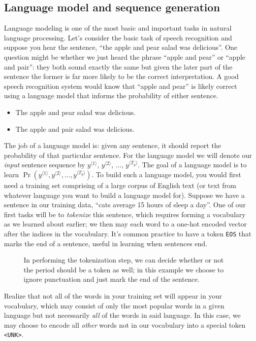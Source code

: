 \documentclass[12pt]{article}
\begin{document}
\subsection{Language model and sequence generation}
Language modeling is one of the most basic and important tasks in natural language processing. Let's consider the basic task of speech recognition and suppose you hear the sentence, ``the apple and pear salad was delicious''. One question might be whether we just heard the phrase ``apple and pear'' or
``apple and pair'': they both sound exactly the same but given the later part of the sentence the former is far more likely to be the correct interpretation. A good speech recognition system would know that ``apple and pear'' is likely correct using a language model that informs the probability of either sentence.
\begin{itemize}
\item The apple and pear salad was delicious.
\item The apple and pair salad was delicious.
\end{itemize}
The job of a language model is: given any sentence, it should report the probability of that particular sentence. For the language model we will denote our \emph{input} sentence sequence by $y^{\langle 1\rangle}$,
$y^{\langle 2 \rangle}$, $\ldots$, $y^{\langle T_y \rangle}$. The goal of a language model is to learn
$\Pr(y^{\langle 1 \rangle}, y^{\langle 2 \rangle}, \ldots, y^{\langle T_y   \rangle})$.
To build such a language model, you would first need a training set comprising of a large corpus of English text (or text from whatever language you want to build a language model for). Suppose we have a sentence in our training data, ``cats average 15 hours of sleep a day''. One of our first tasks will be to \emph{tokenize} this sentence, which requires forming a vocabulary as we learned about earlier; we then may each word to a one-hot encoded vector after the indices in the vocabulary. It's common practice to have a token \texttt{EOS} that marks the end of a sentence, useful in learning when sentences end.
\begin{figure}[h]
  \centering
  \caption{\footnotesize In performing the tokenization step, we can decide whether or not the period should be a token as well; in this example we choose to ignore punctuation and just mark the end of the sentence.}
\end{figure}
Realize that not all of the words in your training set will appear in your vocabulary, which may consist of only the most popular words in a given language but not necessarily \emph{all} of the words in said language. In this case, we may choose to encode all \emph{other} words not in our vocabulary into a special token \texttt{<UNK>}.
\end{document}
